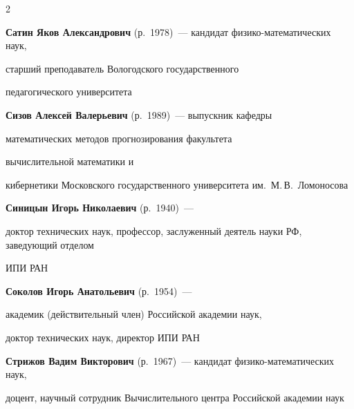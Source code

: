 \begin{multicols}{2}
\vspace*{4pt}







\noindent

\textbf{Сатин Яков Александрович} (р.\ 1978)~--- кандидат фи\-зи\-ко-математических наук,

старший преподаватель Вологодского государственного

педагогического университета



\vspace*{4pt}



\noindent

\textbf{Сизов Алексей Валерьевич} (р.\ 1989)~--- выпускник кафедры 

математических методов прогнозирования факультета

вычислительной математики и 

кибернетики Московского государственного университета им.\ М.\,В.~Ломоносова



\pagebreak



\noindent

\textbf{Синицын Игорь Николаевич} (р.\ 1940)~--- 

доктор технических наук, профессор, заслуженный деятель науки РФ, заведующий отделом

ИПИ РАН



\vspace*{4pt}



\noindent 

\textbf{Соколов Игорь Анатольевич} (р.\ 1954)~---

академик (действительный член) Российской академии наук,

доктор технических наук, директор ИПИ РАН



\vspace*{2pt}



\noindent

\textbf{Стрижов Вадим Викторович} (р.\ 1967)~--- кандидат фи\-зи\-ко-ма\-те\-ма\-ти\-че\-ских наук,

доцент, научный сотрудник Вычислительного центра Российской академии наук










\end{multicols}
